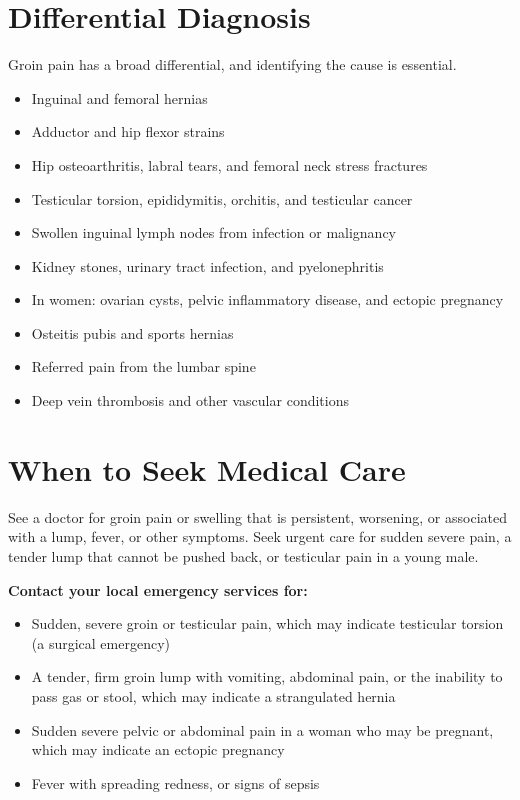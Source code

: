 \section*{Differential Diagnosis}
Groin pain has a broad differential, and identifying the cause is essential.

\begin{itemize}
    \item Inguinal and femoral hernias
    \item Adductor and hip flexor strains
    \item Hip osteoarthritis, labral tears, and femoral neck stress fractures
    \item Testicular torsion, epididymitis, orchitis, and testicular cancer
    \item Swollen inguinal lymph nodes from infection or malignancy
    \item Kidney stones, urinary tract infection, and pyelonephritis
    \item In women: ovarian cysts, pelvic inflammatory disease, and ectopic pregnancy
    \item Osteitis pubis and sports hernias
    \item Referred pain from the lumbar spine
    \item Deep vein thrombosis and other vascular conditions
\end{itemize}

\section*{When to Seek Medical Care}
See a doctor for groin pain or swelling that is persistent, worsening, or associated with a lump, fever, or other symptoms. Seek urgent care for sudden severe pain, a tender lump that cannot be pushed back, or testicular pain in a young male.

\textbf{Contact your local emergency services for:}
\begin{itemize}
    \item Sudden, severe groin or testicular pain, which may indicate testicular torsion (a surgical emergency)
    \item A tender, firm groin lump with vomiting, abdominal pain, or the inability to pass gas or stool, which may indicate a strangulated hernia
    \item Sudden severe pelvic or abdominal pain in a woman who may be pregnant, which may indicate an ectopic pregnancy
    \item Fever with spreading redness, or signs of sepsis
\end{itemize}

